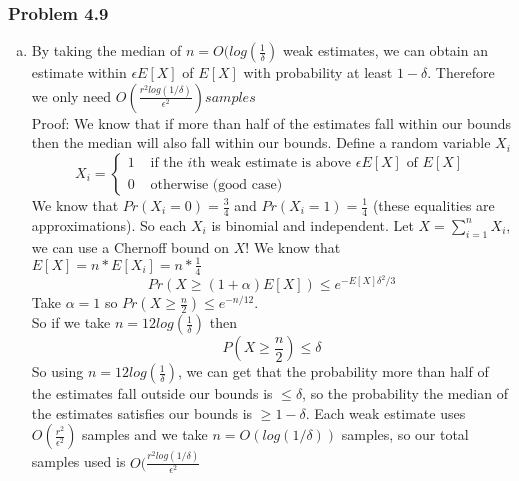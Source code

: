 \documentclass[12pt,letterpaper]{article}
\newenvironment{answer}[1]{
  \subsubsection*{Problem #1}
}{\newpage}
\begin{document}
\begin{answer}{4.9}
\begin{enumerate}[(a)]
	\item By taking the median of $n = O(log(\frac{1}{\delta})$ weak estimates, we can obtain an estimate within $\epsilon E[X]$ of $E[X]$ with probability at least $1 - \delta$. Therefore we only need $O\left(\frac{r^2log(1/\delta)}{\epsilon^2}\right) samples$ \\
	Proof: We know that if more than half of the estimates fall within our bounds then the median will also fall within our bounds. Define a random variable $X_i$
		$$X_i = \begin{cases}
			1 &\mbox{ if the $i$th weak estimate is above $\epsilon E[X]$ of $E[X]$}\\
			0 &\mbox{ otherwise (good case)}
		\end{cases}$$
	We know that $Pr(X_i = 0) = \frac{3}{4}$ and $Pr(X_i = 1) = \frac{1}{4}$ (these equalities are approximations). So each $X_i$ is binomial and independent.
		Let $X = \sum_{i = 1}^n X_i$, we can use a Chernoff bound on $X$! We know that $E[X] = n*E[X_i] = n * \frac{1}{4}$
		$$ Pr(X  \ge (1 + \alpha)E[X]) \le e^{-E[X]\delta^2 / 3}$$
		Take $\alpha = 1$
		so $Pr(X \ge \frac{n}{2}) \le e^{-n/12}$.
		\\
		So if we take $n = 12log(\frac{1}{\delta})$ then
		$$ P(X \ge \frac{n}{2}) \le \delta$$
		So using $n = 12log(\frac{1}{\delta})$, we can get that the probability more than half of the estimates fall outside our bounds is $\le \delta$, so the probability the median of the estimates satisfies our bounds is $\ge 1- \delta$.
		Each weak estimate uses $O(\frac{r^2}{\epsilon^2})$ samples and we take $n = O(log(1/\delta))$ samples, so our total samples used is
		$O(\frac{r^2 log(1/\delta)}{\epsilon^2}$

\end{enumerate}
\end{answer}
\end{document}
